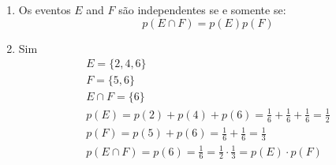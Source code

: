 \item
\begin{enumerate}
  \item
  Os eventos $E$ and $F$ são independentes se e somente se:
  \[p(E \cap F) = p(E)p(F)\]

  \item
  Sim
  \[\begin{array}{l}
  E = \{ 2,4,6\} \\
  F = \{ 5,6\} \\
  E \cap F = \{ 6\} \\
  p(E) = p(2) + p(4) + p(6) = \frac{1}{6} + \frac{1}{6} + \frac{1}{6} = \frac{1}{2}\\
  p(F) = p(5) + p(6) = \frac{1}{6} + \frac{1}{6} = \frac{1}{3}\\
  p(E \cap F) = p(6) = \frac{1}{6} = \frac{1}{2} \cdot \frac{1}{3} = p(E) \cdot p(F)
  \end{array}\]
\end{enumerate}
